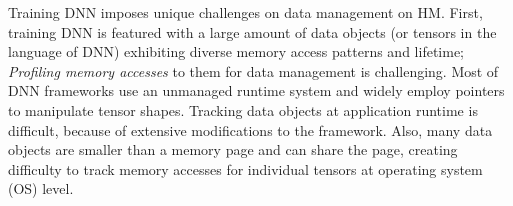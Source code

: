 \begin{comment}
Since modern HM typically serves CPU, we study CPU with HM for DNN training. Using CPU for training is commonly supported by hardware vendor (e.g., Intel MKL-DNN~\cite{intelMKL} and ARM Compute Library~\cite{arm_cl}), and has the following four benefits. 
\textit{First}, the trend of democratizing DNN~\cite{democratization_ai} makes CPU an appealing solution. compared with GPU, CPU is more approachable and affordable, especially for personal users or small-sized enterprises. \textit{Second}, some data centers do not have GPU and simply use CPU for training. Such examples include the Cori~\cite{lbnl_cori} at Lawrence Berkeley National Lab and Stampede2~\cite{tacc_stampede} at TACC for scientific machine learning~\cite{ 8658402, Kurth:2018:EDL:3291656.3291724, Mathuriya:2018:CUD:3291656.3291743,  tacc_ml_CPU_training}. \textit{Third}, for those DNN models that lack thread level parallelism, GPU can perform worse than CPU. For example, training some CNN (e.g., the wide-and-deep model~\cite{DBLP:journals/corr/ChengKHSCAACCIA16}) and some deep reinforcement learning models (e.g., DQN~\cite{Hasselt:2016:DRL:3016100.3016191}), CPU performs faster than GPU. In our evaluation, using 8-core Intel i7-7700K CPU and NVIDIA Titan XP GPU to train the wide-and-deep model, the training throughput on CPU is 4x of on GPU (763 and 196 global steps per second for CPU and GPU respectively). \textit{Fourth}, on a public cloud, CPU is cheaper than GPU. For example, on the google cloud, one vCPU %
is only 1/46 and 1/78 of NIVIDA P100 and V100 GPU, in terms of cost per hour. When the training throughputs on CPU and GPU are comparable, using CPU can be easily more cost effective. 
\end{comment}


Training DNN imposes unique challenges on data management on HM. First, training DNN is featured with a large amount of data objects \textcolor{check}{(or tensors in the language of DNN) exhibiting diverse memory access patterns and lifetime}; \textit{Profiling memory accesses} to them for data management is challenging. \textcolor{check}{Most of DNN frameworks use an unmanaged runtime system and widely employ pointers to manipulate tensor shapes. Tracking data objects at application runtime is difficult, because of extensive modifications to the framework. Also, many data objects are smaller than a memory page and can share the page, creating difficulty to track memory accesses for individual tensors at operating system (OS) level.}

